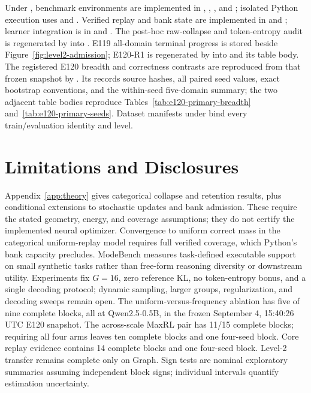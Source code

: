 Under , benchmark environments are implemented in
, , , and
; isolated Python execution uses
 and .
Verified replay and bank state are implemented in
 and ; learner
integration is in  and . The
post-hoc raw-collapse and token-entropy audit is regenerated by
 into
. E119 all-domain
terminal progress is stored beside Figure~\ref{fig:level2-admission}; E120-R1 is
regenerated by 
into  and its table body.
The registered E120 breadth and correctness contrasts are reproduced from
that frozen snapshot by
. Its
 records source hashes, all
paired seed values, exact bootstrap conventions, and the within-seed
five-domain summary; the two adjacent table bodies reproduce
Tables~\ref{tab:e120-primary-breadth} and~\ref{tab:e120-primary-seeds}.
Dataset manifests under  bind every train/evaluation identity
and level.

\section{Limitations and Disclosures}
\label{app:limitations}

Appendix~\ref{app:theory} gives categorical collapse and retention
results, plus conditional extensions to stochastic updates and bank admission.
These require the stated geometry, energy, and coverage assumptions; they do
not certify the implemented neural optimizer. Convergence to uniform correct
mass in the categorical uniform-replay model requires full verified coverage,
which Python's bank capacity precludes. ModeBench measures
task-defined executable support on small synthetic tasks rather than free-form
reasoning diversity or downstream utility. Experiments fix \(G=16\), zero
reference KL, no token-entropy bonus, and a single decoding protocol; dynamic
sampling, larger groups, regularization, and decoding sweeps remain open. The
uniform-versus-frequency ablation has five of nine complete blocks, all at
Qwen2.5-0.5B, in the frozen September 4, 15:40:26 UTC E120 snapshot. The across-scale
MaxRL pair has 11/15 complete blocks; requiring all four arms leaves ten
complete blocks and one four-seed block. Core replay evidence contains 14
complete blocks and one four-seed block. Level-2 transfer remains complete
only on Graph. Sign tests are nominal exploratory summaries assuming
independent block signs; individual intervals quantify estimation uncertainty.

